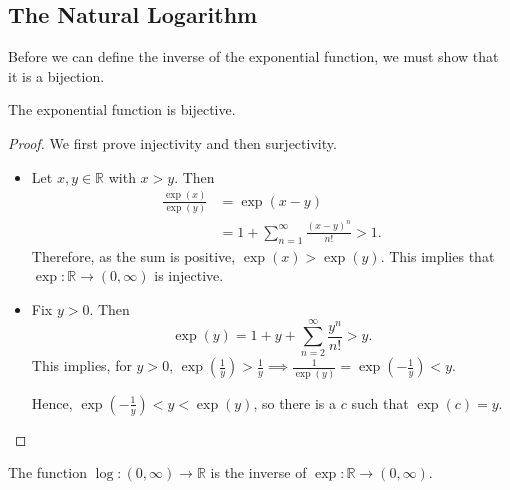 \subsection{The Natural Logarithm}

Before we can define the inverse of the exponential function, we must show that it is a bijection.
\begin{prop} The exponential function is bijective.
\end{prop}
\begin{proof} We first prove injectivity and then surjectivity.
  \begin{itemize}
    \item  Let $x, y \in \mathbb{R}$ with $x > y$. Then
    \begin{align*}
      \frac{\exp(x)}{\exp(y)} &= \exp(x - y) \\
                              &= 1 + \sum_{n=1}^{\infty} \frac{(x - y)^n}{n!} > 1
    .\end{align*}
    Therefore, as the sum is positive, $\exp(x) > \exp(y)$. This implies that $\exp : \mathbb{R} \rightarrow (0, \infty)$ is injective.
  \item Fix $y > 0$. Then
    \[\exp(y) = 1 + y + \sum_{n=2}^{\infty} \frac{y^n}{n!} > y.\]
    This implies, for $y > 0$, $\exp(\frac{1}{y}) > \frac{1}{y} \implies \frac{1}{\exp(y)} = \exp(- \frac{1}{y}) < y$.

    Hence, $\exp(- \frac{1}{y}) < y < \exp(y)$, so there is a $c$ such that $\exp(c) = y$.
  \end{itemize}
\end{proof}

\begin{definition}

  The function $\log : (0, \infty) \rightarrow \mathbb{R}$ is the inverse of $\exp : \mathbb{R} \rightarrow (0, \infty)$.
    
\end{definition}

